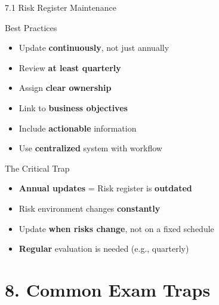 \documentclass[9pt]{beamer}  %
\begin{document}
	\begin{frame}{7.1 Risk Register Maintenance}
		\begin{block}{Best Practices}
			\begin{itemize}
				\item Update \textbf{continuously}, not just annually
				\item Review \textbf{at least quarterly}
				\item Assign \textbf{clear ownership}
				\item Link to \textbf{business objectives}
				\item Include \textbf{actionable} information
				\item Use \textbf{centralized} system with workflow
			\end{itemize}
		\end{block}
		
		\begin{alertblock}{The Critical Trap}
			\begin{itemize}
				\item \textbf{Annual updates} = Risk register is \textbf{outdated}
				\item Risk environment changes \textbf{constantly}
				\item Update \textbf{when risks change}, not on a fixed schedule
				\item \textbf{Regular} evaluation is needed (e.g., quarterly)
			\end{itemize}
		\end{alertblock}
	\end{frame}
	
	\section{8. Common Exam Traps}
	
\end{document}

